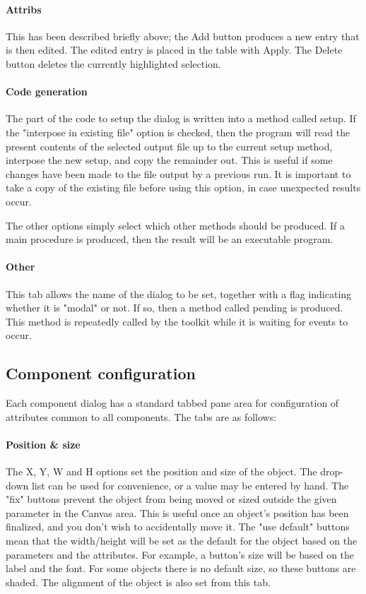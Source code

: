 \paragraph{Attribs}
This has been described briefly above; the Add button produces a new
entry that is then edited. The edited entry is placed in the table with
Apply. The Delete button deletes the currently highlighted selection.

\paragraph{Code generation}
The part of the code to setup the dialog is written into a method called
setup. If the "interpose in existing file"
option is checked, then the program will read the present contents of
the selected output file up to the current setup method, interpose the
new setup, and copy the remainder out. This is useful if some changes
have been made to the file output by a previous run. It is
important to take a copy of the existing file before using this option,
in case unexpected results occur.

The other options simply select which other methods should be produced.
If a main procedure is produced, then the result will be an executable
program.

\paragraph{Other}
This tab allows the name of the dialog to be set, together with a flag
indicating whether it is "modal" or not. If
so, then a method called pending is produced. This method is repeatedly
called by the toolkit while it is waiting for events to occur.


\subsection*{Component configuration}

Each component dialog has a standard tabbed pane area for configuration
of attributes common to all components. The tabs are as follows:

\paragraph{Position \& size}
The X, Y, W and H options set the position and size of the object. The
drop-down list can be used for convenience, or a value may be entered
by hand. The "fix" buttons prevent the
object from being moved or sized outside the given parameter in the
Canvas area. This is useful once an object's position
has been finalized, and you don't wish to accidentally
move it. The "use default" buttons mean
that the width/height will be set as the default for the object based
on the parameters and the attributes. For example, a
button's size will be based on the label and the font.
For some objects there is no default size, so these buttons are shaded.
The alignment of the object is also set from this tab.


